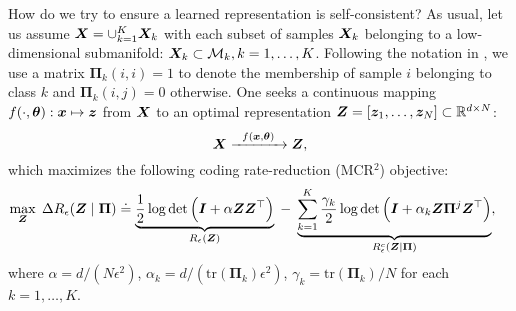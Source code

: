 \documentclass[../../book-main.tex]{subfiles}
\begin{document}
How do we try to ensure a learned representation is self-consistent? As usual, let us assume $\bm{X} = \cup_{k=1}^K \bm{X}_k$ with each subset of samples $\bm{X}_k$ belonging to a low-dimensional submanifold: $\bm{X}_k \subset \mathcal{M}_k, k = 1,\ldots, K$. Following the notation in , we use a matrix $\bm \Pi_k(i,i) = 1$ to denote the membership of sample $i$ belonging to class $k$ and $\bm \Pi_k(i,j) = 0$ otherwise. One seeks a continuous mapping $f(\cdot,\bm \theta): \bm{x} \mapsto \bm{z}$ from $\bm{X}$ to an optimal representation $\bm{Z} = [\bm{z}_1, \ldots, \bm{z}_N] \subset \mathbb{R}^{d \times N}$:
\begin{equation}
\bm X  \xrightarrow{\hspace{2mm} f(\bm{x}, \bm \theta) \hspace{2mm}} \bm Z, 
\label{eqn:LDR}
\end{equation}
which maximizes the following coding rate-reduction (MCR$^2$) objective:
\begin{equation}\label{eq:mcr2-formulation}
\begin{split}
\max_{\Z} \; \Delta R_\epsilon(\Z  \mid \bm{\Pi}) %
&\doteq \underbrace{\frac{1}{2}\log\det \Big(\I + {\alpha} \Z \Z^\top \Big)}_{R_{\epsilon}(\Z)} \;-\; \underbrace{\sum_{k=1}^{K}\frac{\gamma_k}{2} \log\det\Big(\I + {\alpha_k} \Z \bm{\Pi}^{j} \Z^\top \Big)}_{R^c_{\epsilon}(\Z \mid \bm \Pi)},
\end{split}
\end{equation}
where $\alpha = {d}/({N\epsilon^2})$, $\alpha_k = d/({\mathrm{tr}(\bm{\Pi}_k)\epsilon^2})$, $\gamma_k =  {\mathrm{tr}(\bm{\Pi}_{k})}/{N}$ for each $k = 1,\dots, K$.
\end{document}
